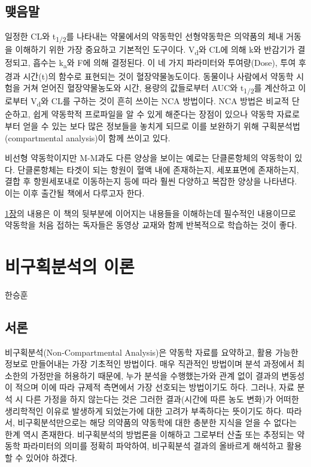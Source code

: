 \documentclass[
  11pt,
  krantz2, a4paper, twoside]{krantz}
\theoremstyle{definition}
\theoremstyle{definition}
\theoremstyle{definition}
\theoremstyle{definition}
\theoremstyle{remark}
\begin{document}
\hypertarget{uxb9fauxc74cuxb9d0}{%
\section{맺음말}\label{uxb9fauxc74cuxb9d0}}

일정한 CL와 t\textsubscript{1/2}를 나타내는 약물에서의 약동학인 선형약동학은 의약품의 체내 거동을 이해하기 위한 가장 중요하고 기본적인 도구이다. 
V\textsubscript{d}와 CL에 의해 k와 반감기가 결정되고, 흡수는 k\textsubscript{a}와 F에 의해 결정된다. 
이 네 가지 파라미터와 투여량(Dose), 투여 후 경과 시간(t)의 함수로 표현되는 것이 혈장약물농도이다.
동물이나 사람에서 약동학 시험을 거쳐 얻어진 혈장약물농도와 시간, 용량의 값들로부터 AUC와 t\textsubscript{1/2}를 계산하고 이로부터 V\textsubscript{d}와 CL를 구하는 것이 흔히 쓰이는 NCA 방법이다. 
NCA 방법은 비교적 단순하고, 쉽게 약동학적 프로파일을 알 수 있게 해준다는 장점이 있으나 약동학 자료로부터 얻을 수 있는 보다 많은 정보들을 놓치게 되므로 이를 보완하기 위해 구획분석법(compartmental analysis)이 함께 쓰이고 있다.

비선형 약동학이지만 M-M과도 다른 양상을 보이는 예로는 단클론항체의 약동학이 있다. 
단클론항체는 타겟이 되는 항원이 혈액 내에 존재하는지, 세포표면에 존재하는지, 결합 후 항원세포내로 이동하는지 등에 따라 훨씬 다양하고 복잡한 양상을 나타낸다. 
이는 이후 출간될 책에서 다루고자 한다.

\protect\hyperlink{principle}{1장}의 내용은 이 책의 뒷부분에 이어지는 내용들을 이해하는데 필수적인 내용이므로 약동학을 처음 접하는 독자들은 동영상 교재와 함께 반복적으로 학습하는 것이 좋다.

\hypertarget{nca-principle}{%
\chapter{비구획분석의 이론}\label{nca-principle}}

\Large\hfill

한승훈
\normalsize

\hypertarget{uxc11cuxb860-1}{%
\section{서론}\label{uxc11cuxb860-1}}

비구획분석(Non-Compartmental Analysis)은 약동학 자료를 요약하고, 활용 가능한 정보로 만들어내는 가장 기초적인 방법이다. 
매우 직관적인 방법이며 분석 과정에서 최소한의 가정만을 허용하기 때문에, 누가 분석을 수행했는가와 관계 없이 결과의 변동성이 적으며 이에 따라 규제적 측면에서 가장 선호되는 방법이기도 하다.
그러나, 자료 분석 시 다른 가정을 하지 않는다는 것은 그러한 결과(시간에 따른 농도 변화)가 어떠한 생리학적인 이유로 발생하게 되었는가에 대한 고려가 부족하다는 뜻이기도 하다. 
따라서, 비구획분석만으로는 해당 의약품의 약동학에 대한 충분한 지식을 얻을 수 없다는 한계 역시 존재한다. 
비구획분석의 방법론을 이해하고 그로부터 산출 또는 추정되는 약동학 파라미터의 의미를 정확히 파악하여, 비구획분석 결과의 올바르게 해석하고 활용할 수 있어야 하겠다.
\end{document}
